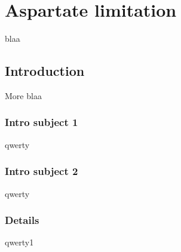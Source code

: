 \chapter{Aspartate limitation}
blaa

\section{Introduction}
More blaa

\subsection{Intro subject 1}
qwerty

\subsection{Intro subject 2}
qwerty
\subsection{Details}
qwerty1
